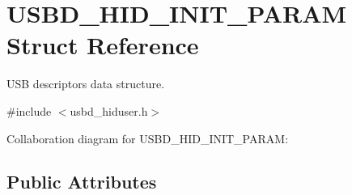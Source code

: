 \hypertarget{structUSBD__HID__INIT__PARAM}{}\section{U\+S\+B\+D\+\_\+\+H\+I\+D\+\_\+\+I\+N\+I\+T\+\_\+\+P\+A\+R\+AM Struct Reference}
\label{structUSBD__HID__INIT__PARAM}


U\+SB descriptors data structure.  




{\ttfamily \#include $<$usbd\+\_\+hiduser.\+h$>$}



Collaboration diagram for U\+S\+B\+D\+\_\+\+H\+I\+D\+\_\+\+I\+N\+I\+T\+\_\+\+P\+A\+R\+AM\+:
\subsection*{Public Attributes}
